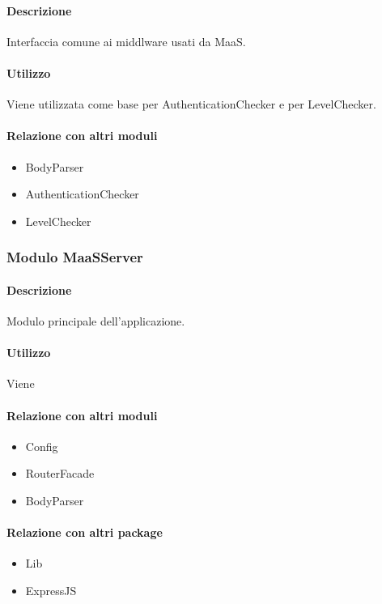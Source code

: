 \paragraph*{Descrizione}
Interfaccia comune ai middlware usati da MaaS.

\paragraph*{Utilizzo}
Viene utilizzata come base per AuthenticationChecker e per LevelChecker.

\paragraph*{Relazione con altri moduli}
\begin{itemize}
\item BodyParser
\item AuthenticationChecker
\item LevelChecker
\end{itemize}

\subsubsection{Modulo MaaSServer}
\paragraph*{Descrizione}
Modulo principale dell'applicazione.

\paragraph*{Utilizzo}
Viene 

\paragraph*{Relazione con altri moduli}
\begin{itemize}
\item Config
\item RouterFacade
\item BodyParser
\end{itemize}

\paragraph*{Relazione con altri package}
\begin{itemize}
\item Lib
\item ExpressJS
\end{itemize}

